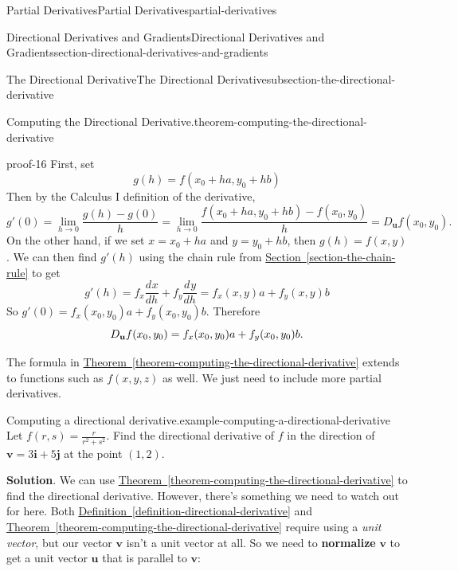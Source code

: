 \documentclass[oneside,10pt,]{book}
\newcommand{\terminology}[1]{\textbf{#1}}
\renewcommand{\qedhere}{\relax}
\numberwithin{equation}{section}
\newcommand{\vv}[1]{\mathbf{#1}}
\newcommand{\dv}[3][]{\dfrac{d^{#1} #2}{d #3^{#1}}}
\begin{document}
\begin{chapterptx}{Partial Derivatives}{}{Partial Derivatives}{}{}{partial-derivatives}
\begin{sectionptx}{Directional Derivatives and Gradients}{}{Directional Derivatives and Gradients}{}{}{section-directional-derivatives-and-gradients}
\begin{subsectionptx}{The Directional Derivative}{}{The Directional Derivative}{}{}{subsection-the-directional-derivative}
\begin{theorem}{Computing the Directional Derivative.}{}{theorem-computing-the-directional-derivative}
%
\end{theorem}
\begin{proofptx}{}{proof-16}
\hypertarget{p-1403}{}%
First, set%
\begin{equation*}
g(h) = f(x_{0}+ha, y_{0} +hb)
\end{equation*}
Then by the Calculus I definition of the derivative,%
\begin{equation*}
g'(0) = \lim_{h\to0}\frac{g(h) - g(0)}{h} = \lim_{h\to0}\frac{f(x_{0}+ha, y_{0}+hb) - f(x_{0},y_{0})}{h} = D_{\vv{u}}f(x_{0},y_{0}).
\end{equation*}
On the other hand, if we set \(x = x_{0} + ha\) and \(y = y_{0} + hb\), then \(g(h) = f(x,y)\). We can then find \(g'(h)\) using the chain rule from \hyperref[section-the-chain-rule]{Section~\ref{section-the-chain-rule}} to get%
\begin{equation*}
g'(h) = f_{x}\dv{x}{h} + f_{y}\dv{y}{h} = f_{x}(x,y)a + f_{y}(x,y)b
\end{equation*}
So \(g'(0) = f_{x}(x_{0},y_{0})a + f_{y}(x_{0},y_{0})b.\) Therefore%
\begin{equation*}
D_{\vv{u}}f(x_{0},y_{0}) = f_{x}(x_{0},y_{0})a + f_{y}(x_{0},y_{0})b.\qedhere
\end{equation*}
%
\end{proofptx}
\hypertarget{p-1404}{}%
The formula in \hyperref[theorem-computing-the-directional-derivative]{Theorem~\ref{theorem-computing-the-directional-derivative}} extends to functions such as \(f(x,y,z)\) as well. We just need to include more partial derivatives.%
\begin{example}{Computing a directional derivative.}{example-computing-a-directional-derivative}%
\hypertarget{p-1405}{}%
Let \(f(r,s) = \frac{r}{r^{2}+s^{2}}\). Find the directional derivative of \(f\) in the direction of \(\vv{v} = 3\vv{i} + 5\vv{j}\) at the point \((1,2)\).%
\par\smallskip%
\noindent\textbf{Solution}.\hypertarget{solution-227}{}\quad%
\hypertarget{p-1406}{}%
We can use \hyperref[theorem-computing-the-directional-derivative]{Theorem~\ref{theorem-computing-the-directional-derivative}} to find the directional derivative. However, there's something we need to watch out for here. Both \hyperref[definition-directional-derivative]{Definition~\ref{definition-directional-derivative}} and \hyperref[theorem-computing-the-directional-derivative]{Theorem~\ref{theorem-computing-the-directional-derivative}} require using a \emph{unit vector}, but our vector \(\vv{v}\) isn't a unit vector at all. So we need to \terminology{normalize} \(\vv{v}\) to get a unit vector \(\vv{u}\) that is parallel to \(\vv{v}\):%

\end{example}
\end{subsectionptx}
\end{sectionptx}
\end{chapterptx}
\end{document}
